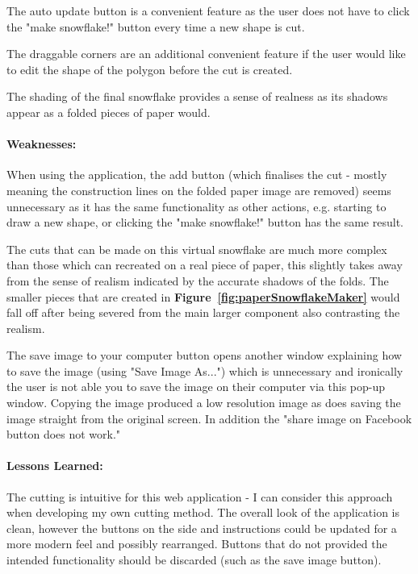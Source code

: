 \documentclass[11pt]{article}
\begin{document}
                The auto update button is a convenient feature as the user does not have to click the "make snowflake!" button every time a new shape is cut. 
                
                The draggable corners are an additional convenient feature if the user would like to edit the shape of the polygon before the cut is created.
                 
                 The shading of the final snowflake provides a sense of realness as its shadows appear as a folded pieces of paper would.
                 
                \paragraph{Weaknesses:}
                When using the application, the add button (which finalises the cut - mostly meaning the construction lines on the folded paper image are removed) seems unnecessary as it has the same functionality as other actions, e.g. starting to draw a new shape, or clicking the "make snowflake!" button has the same result.
                
                The cuts that can be made on this virtual snowflake are much more complex than those which can recreated on a real piece of paper, this slightly takes away from the sense of realism indicated by the accurate shadows of the folds. The smaller pieces that are created in \textbf{Figure~\ref{fig:paperSnowflakeMaker}} would fall off after being severed from the main larger component also contrasting the realism.
                
                The save image to your computer button opens another window explaining how to save the image (using "Save Image As...") which is unnecessary and ironically the user is not able you to save the image on their computer via this pop-up window. Copying the image produced a low resolution image as does saving the image straight from the original screen. In addition the "share image on Facebook button does not work."
                
                \paragraph{Lessons Learned:}
                The cutting is intuitive for this web application - I can consider this approach when developing my own cutting method. The overall look of the application is clean, however the buttons on the side and instructions could be updated for a more modern feel and possibly rearranged. Buttons that do not provided the intended functionality should be discarded (such as the save image button).
                
\end{document}
